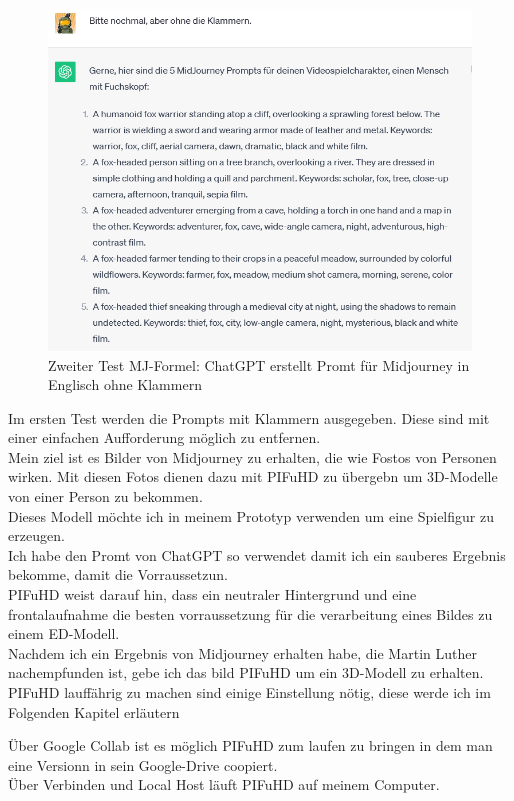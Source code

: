 \documentclass[10pt,a4paper,bibliography=totocnumbered,listof=totocnumbered]{scrartcl}
\begin{document}
\begin{figure}[h]
        	\centering
\includegraphics[scale=0.7]{BilderFuerBA/CGPTMidJourneyMartinLuther/06.png}
        	\caption{Zweiter Test MJ-Formel: ChatGPT erstellt Promt für Midjourney in Englisch ohne Klammern}
        	\label{fig:chatgpt-ptompt-Midjourney-06}
\end{figure}
Im ersten Test werden die Prompts mit Klammern ausgegeben. Diese sind mit einer einfachen Aufforderung möglich zu entfernen.
\\
Mein ziel ist es Bilder von Midjourney zu erhalten, die wie Fostos von Personen wirken. Mit diesen Fotos dienen dazu mit PIFuHD zu übergebn um 3D-Modelle von einer Person zu bekommen.
\\
Dieses Modell möchte ich in meinem Prototyp verwenden um eine Spielfigur zu erzeugen.
\\
Ich habe den Promt von ChatGPT so verwendet damit ich ein sauberes Ergebnis bekomme, damit die Vorraussetzun.
\\
PIFuHD weist darauf hin, dass ein neutraler Hintergrund und eine frontalaufnahme die besten vorraussetzung für die verarbeitung eines Bildes zu einem ED-Modell.
\\
Nachdem ich ein Ergebnis von Midjourney erhalten habe, die Martin Luther nachempfunden ist, gebe ich das bild PIFuHD um ein 3D-Modell zu erhalten.
\\
PIFuHD lauffährig zu machen sind einige Einstellung nötig, diese werde ich im Folgenden Kapitel erläutern
 
Über Google Collab ist es möglich PIFuHD zum laufen zu bringen in dem man eine Versionn in sein Google-Drive coopiert.
\\
Über Verbinden und Local Host läuft PIFuHD auf meinem Computer.
\\
 
\end{document}
